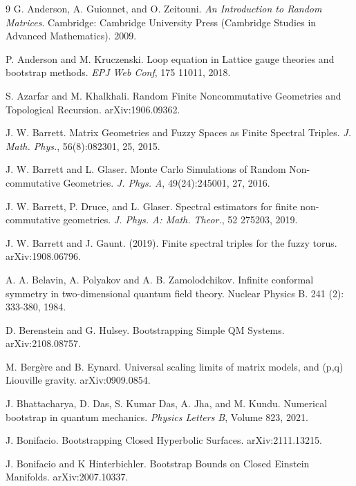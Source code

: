 \documentclass[10pt]{article}
\begin{document}
\begin{thebibliography}{9}
G. Anderson, A. Guionnet, and O. Zeitouni. \textit{An Introduction to Random Matrices}. Cambridge:
Cambridge University Press (Cambridge Studies in Advanced Mathematics). 2009.

P. Anderson and M. Kruczenski. Loop equation in Lattice gauge theories and bootstrap methods. \textit{EPJ Web Conf}, 175  11011, 2018.

S. Azarfar and M. Khalkhali. Random Finite Noncommutative Geometries and Topological Recursion.
arXiv:1906.09362. 



J. W.  Barrett. Matrix Geometries and Fuzzy Spaces as Finite Spectral Triples. \textit{J. Math. Phys.},
56(8):082301, 25, 2015.



J. W.  Barrett and L.  Glaser. Monte Carlo Simulations of Random Non-commutative Geometries.
\textit{J. Phys. A}, 49(24):245001, 27, 2016.

J. W. Barrett, P. Druce, and L. Glaser. Spectral estimators for finite non-commutative geometries. \textit{J. Phys. A: Math. Theor.}, 52 275203, 2019.

J. W. Barrett and J. Gaunt. (2019). Finite spectral triples for the fuzzy torus. arXiv:1908.06796.

A. A. Belavin, A. Polyakov and A. B. Zamolodchikov.  Infinite conformal symmetry in two-dimensional quantum field theory. Nuclear Physics B. 241 (2): 333-380, 1984.

D. Berenstein and G. Hulsey. Bootstrapping Simple QM Systems. 	arXiv:2108.08757.

M. Berg\`{e}re and B. Eynard. Universal scaling limits of matrix models, and (p,q) Liouville gravity. arXiv:0909.0854.

J. Bhattacharya, D. Das, S. Kumar Das, A. Jha, and M. Kundu.
Numerical bootstrap in quantum mechanics.
{\it Physics Letters B},
Volume 823,
2021.




 J. Bonifacio. Bootstrapping Closed Hyperbolic Surfaces. arXiv:2111.13215.

J. Bonifacio and K Hinterbichler. Bootstrap Bounds on Closed Einstein Manifolds. 	arXiv:2007.10337.



\end{thebibliography}
\end{document}
